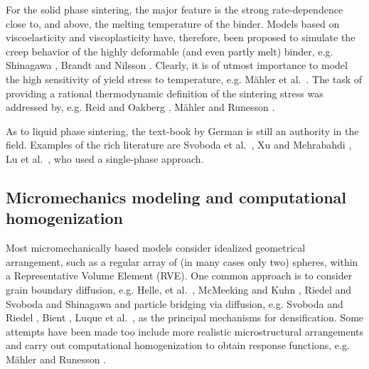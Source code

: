\documentclass[MikaelDissertation.tex]{subfiles}
\begin{document}
For the solid phase sintering, the major feature is the strong rate-dependence close to, and above, the melting temperature of the binder.
Models based on viscoelasticity and viscoplasticity have, therefore, been proposed to simulate the creep behavior of the highly deformable (and even partly melt) binder, e.g. Shinagawa \cite{shinagawa_finite_1996}, Brandt and Nilsson \cite{brandt_fe-simulation_1998}.
Clearly, it is of utmost importance to model the high sensitivity of yield stress to temperature, e.g. Mähler et al.\ \cite{mahler_modelling_2000}.
The task of providing a rational thermodynamic definition of the sintering stress was addressed by, e.g. Reid and Oakberg \cite{reid_continuum_1990}, Mähler and Runesson \cite{mahler_constitutive_2003}.

As to liquid phase sintering, the text-book by German \cite{german_sintering_1996} is still an authority in the field.
Examples of the rich literature are Svoboda et al.\ \cite{svoboda_model_1996}, Xu and Mehrabahdi \cite{xu_micromechanical_1997}, Lu et al.\ \cite{lu_porosity_2001}, who used a single-phase approach.


\subsection{Micromechanics modeling and computational homogenization}

Most micromechanically based models consider idealized geometrical arrangement, such as a regular array of (in many cases only two) spheres, within a Representative Volume Element (RVE).
One common approach is to consider grain boundary diffusion, e.g. Helle, et al.\ \cite{helle_hot-isostatic_1985}, McMeeking and Kuhn \cite{mcmeeking_diffusional_1992}, Riedel and Svoboda \cite{riedel_theoretical_1993} and Shinagawa \cite{shinagawa_finite_1996} and particle bridging via diffusion, e.g. Svoboda and Riedel \cite{svoboda_new_1995}, Bient \cite{bient_modeling_2004}, Luque et al.\ \cite{luque_simulation_2005}, as the principal mechanisms for densification.
Some attempts have been made too include more realistic microstructural arrangements and carry out computational homogenization to obtain response functions, e.g. Mähler and Runesson \cite{mahler_modelling_2000}.
\end{document}
